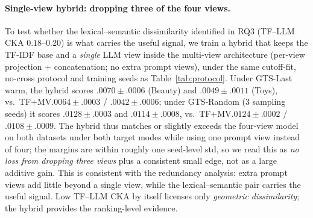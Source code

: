 \documentclass[sigconf,natbib=true,anonymous]{acmart}
\newcommand{\tfidf}{\textsc{TF-IDF}\xspace}
\newcommand{\tfmv}{\textsc{TF+MV}\xspace}
\begin{document}
\paragraph{Single-view hybrid: dropping three of the four views.}
To test whether the lexical--semantic dissimilarity identified in RQ3 (TF--LLM CKA $0.18$--$0.20$) is what carries the useful signal, we train a hybrid that keeps the \tfidf base and a \emph{single} LLM view inside the multi-view architecture (per-view projection + concatenation; no extra prompt views), under the same cutoff-fit, no-cross protocol and training seeds as Table~\ref{tab:protocol}.
Under GTS-Last warm, the hybrid scores $.0070\pm.0006$ (Beauty) and $.0049\pm.0011$ (Toys), vs.\ \tfmv $.0064\pm.0003$ / $.0042\pm.0006$; under GTS-Random (3 sampling seeds) it scores $.0128\pm.0003$ and $.0114\pm.0008$, vs.\ \tfmv $.0124\pm.0002$ / $.0108\pm.0009$.
The hybrid thus matches or slightly exceeds the four-view model on both datasets under both target modes while using one prompt view instead of four; the margins are within roughly one seed-level std, so we read this as \emph{no loss from dropping three views} plus a consistent small edge, not as a large additive gain.
This is consistent with the redundancy analysis: extra prompt views add little beyond a single view, while the lexical--semantic pair carries the useful signal.
Low TF--LLM CKA by itself licenses only \emph{geometric dissimilarity}; the hybrid provides the ranking-level evidence.
\end{document}
